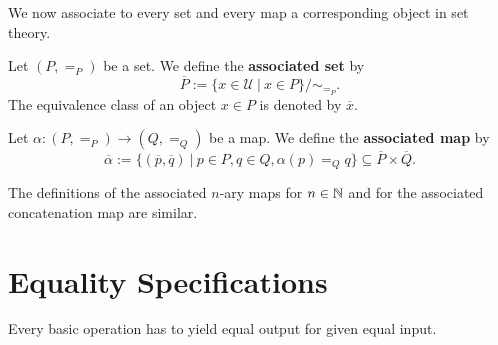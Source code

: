 We now associate to every \GAP set and every \GAP map a corresponding object in set theory.

\begin{definition}
 Let $(P, =_P)$ be a \GAP set. We define the \textbf{associated set} by
 \[
  \overline{P} := \{ x \in \mathcal{U} ~|~ x \in P \} / \sim_{ =_P }.
 \]
 The equivalence class of an object $x \in P$ is denoted by $\overline{x}$.
\end{definition}

\begin{definition}
 Let $\alpha: (P, =_P) \rightarrow (Q, =_Q)$ be a \GAP map. We define the \textbf{associated map} by
 \[
  \overline{\alpha} := \{ (\overline{p}, \overline{q}) ~|~ p \in P, q \in Q, \alpha( p ) =_{Q} q \} \subseteq \overline{P} \times \overline{Q}.
 \]
\end{definition}

The definitions of the associated $n$-ary maps for $n \in \mathbb{N}$ and for the associated concatenation map are similar.

\section{Equality Specifications}
\label{section:equality_specifications}

\begin{specification}
 Every basic operation has to yield equal output for given equal input.
 \end{specification}

